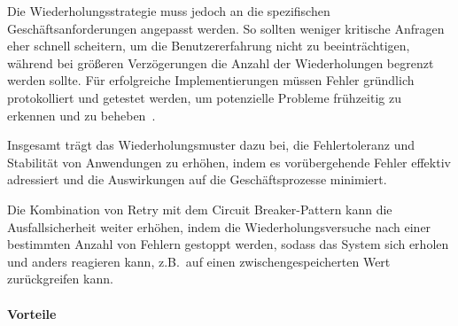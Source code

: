 Die Wiederholungsstrategie muss jedoch an die spezifischen Geschäftsanforderungen angepasst werden.
So sollten weniger kritische Anfragen eher schnell scheitern, um die Benutzererfahrung nicht zu beeinträchtigen,
während bei größeren Verzögerungen die Anzahl der Wiederholungen begrenzt werden sollte.
Für erfolgreiche Implementierungen müssen Fehler gründlich protokolliert und getestet werden,
um potenzielle Probleme frühzeitig zu erkennen und zu beheben~\cite{Meheden.2021}.

Insgesamt trägt das Wiederholungsmuster dazu bei, die Fehlertoleranz und Stabilität von Anwendungen zu erhöhen,
indem es vorübergehende Fehler effektiv adressiert und die Auswirkungen auf die Geschäftsprozesse minimiert.

Die Kombination von Retry mit dem Circuit Breaker-Pattern kann die Ausfallsicherheit weiter erhöhen,
indem die Wiederholungsversuche nach einer bestimmten Anzahl von Fehlern gestoppt werden,
sodass das System sich erholen und anders reagieren kann, z.B.\ auf einen zwischengespeicherten Wert zurückgreifen kann.

\paragraph{Vorteile}

